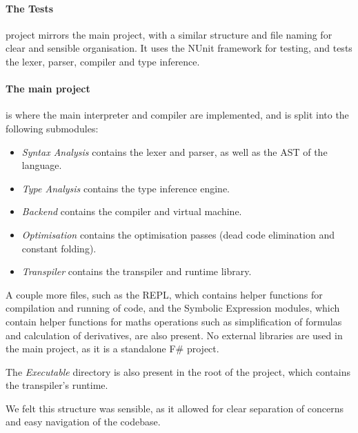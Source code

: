 \paragraph{The Tests} project mirrors the main project, with a similar structure and file naming for clear and sensible
organisation.
It uses the NUnit framework for testing, and tests the lexer, parser, compiler and type inference.

\paragraph{The main project} is where the main interpreter and compiler are implemented, and is split into the following
submodules:
\begin{itemize}
    \item \textit{Syntax Analysis} contains the lexer and parser, as well as the AST of the language.
    \item \textit{Type Analysis} contains the type inference engine.
    \item \textit{Backend} contains the compiler and virtual machine.
    \item \textit{Optimisation} contains the optimisation passes (dead code elimination and constant folding).
    \item \textit{Transpiler} contains the transpiler and runtime library.
\end{itemize}
A couple more files, such as the REPL, which contains helper functions for compilation and running of code, and the
Symbolic Expression modules, which contain helper functions for maths operations such as simplification of formulas 
and calculation of derivatives, are also present.
No external libraries are used in the main project, as it is a standalone F\# project.

The \textit{Executable} directory is also present in the root of the project, which contains the transpiler's runtime.

We felt this structure was sensible, as it allowed for clear separation of concerns and easy navigation of the codebase.

